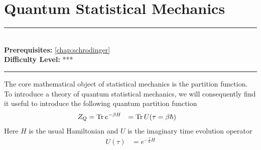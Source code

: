 \documentclass[book.tex]{subfiles}
\begin{document}
\chapter{Quantum Statistical Mechanics}

\label{chap:quantum_statistical_mechanics}
\noindent\rule{11cm}{0.4pt} \\
\textbf{Prerequisites:}  \autoref{chap:schrodinger} \\
\textbf{Difficulty Level:} *** \\
\noindent\rule{11cm}{0.4pt}
\vspace{5mm}

The core mathematical object of statistical mechanics is the partition function. To introduce a theory of quantum statistical mechanics, we will consequently find it useful to introduce the following quantum partition function
\begin{align}
    Z_Q &= \operatorname{Tr} e^{-\beta H} &= \operatorname{Tr} U(\tau &= \beta \hbar)
\end{align}
Here $H$ is the usual Hamiltonian and $U$ is the imaginary time evolution operator
\begin{align}
    U(\tau) &= e^{-\frac{\tau}{\hbar}H}
\end{align}
\end{document}
